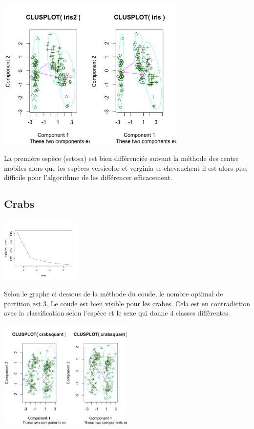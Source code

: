 \documentclass[a4paper,12pt]{report}
\begin{document}
\includegraphics[width=0.7\textwidth]{ex2_iris_4.png}

La première espèce (setosa) est bien différenciée suivant la méthode des centre mobiles alors que les espèces versicolor et verginia se chevauchent il est alors plus difficile pour l'algorithme de les différencer efficacement. 

\subsection*{Crabs}

\includegraphics[width=0.3\textwidth]{ex2_crab_1.png}

Selon le graphe ci dessous de la méthode du coude, le nombre optimal de partition est 3. Le coude est bien visible pour les crabes. Cela est en contradiction avec la classification selon l'espèce et le sexe qui donne 4 classes diffèrentes.  


\includegraphics[width=0.5\textwidth]{ex2_crab_3.png}
\end{document}
